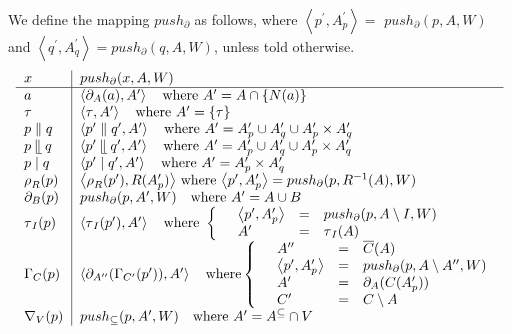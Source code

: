 \documentclass{article}
\begin{document}
We define the mapping $push_{\partial }$ as follows, where $\left\langle
p^{\prime },A_{p}^{\prime }\right\rangle =$ $push_{\partial }(p,A,W)$ and $%
\left\langle q^{\prime },A_{q}^{\prime }\right\rangle =push_{\partial
}(q,A,W)$, unless told otherwise.%
\[
\begin{tabular}{l|l}
$x$ & $push_{\partial }(x,A,W)$ \\ \hline
$a$ & $\left\langle \partial _{A}(a),A^{\prime }\right\rangle \text{ where }%
A^{\prime }=A\cap \{N(a)\}$ \\ 
$\tau $ & $\left\langle \tau ,A^{\prime }\right\rangle \text{ where }%
A^{\prime }=\{\tau \}$ \\ 
$p\parallel q$ & $\left\langle p^{\prime }\parallel q^{\prime },A^{\prime
}\right\rangle \text{ where }A^{\prime }=A_{p}^{\prime }\cup A_{q}^{\prime
}\cup A_{p}^{\prime }\times A_{q}^{\prime }$ \\ 
$p\mathbin{\mathrel{\llfloor}}q$ & $\left\langle p^{\prime }%
\mathbin{\mathrel{\llfloor}}q^{\prime },A^{\prime }\right\rangle \text{
where }A^{\prime }=A_{p}^{\prime }\cup A_{q}^{\prime }\cup A_{p}^{\prime
}\times A_{q}^{\prime }$ \\ 
$p\mid q$ & $\left\langle p^{\prime }\mid q^{\prime },A^{\prime
}\right\rangle \text{ where }A^{\prime }=A_{p}^{\prime }\times A_{q}^{\prime
}$ \\ 
$\rho _{R}(p)$ & $\left\langle \rho _{R}(p^{\prime }),R(A_{p}^{\prime
})\right\rangle $ where $\left\langle p^{\prime },A_{p}^{\prime
}\right\rangle =push_{\partial }(p,R^{-1}(A),W)$ \\ 
$\partial _{B}(p)$ & $push_{\partial }(p,A^{\prime },W)\text{ where }%
A^{\prime }=A\cup B$ \\ 
$\tau _{I}(p)$ & $\left\langle \tau _{I}(p^{\prime }),A^{\prime
}\right\rangle \text{ where }\left\{ \text{ }%
\begin{array}{lll}
\left\langle p^{\prime },A_{p}^{\prime }\right\rangle & = & push_{\partial
}(p,A\setminus I,W) \\ 
A^{\prime } & = & \tau _{I}(A)%
\end{array}%
\right. $ \\ 
$\Gamma _{C}(p)$ & $\left\langle \partial _{A^{\prime \prime }}(\Gamma
_{C^{\prime }}(p^{\prime })),A^{\prime }\right\rangle \text{ where}\left\{ 
\text{ }%
\begin{array}{lll}
A^{\prime \prime } & = & \overline{C}(A) \\ 
\left\langle p^{\prime },A_{p}^{\prime }\right\rangle & = & push_{\partial
}(p,A\setminus A^{\prime \prime },W) \\ 
A^{\prime } & = & \partial _{A}(C(A_{p}^{\prime })) \\ 
C^{\prime } & = & C\setminus A%
\end{array}%
\right. $ \\ 
$\nabla _{V}(p)$ & $push_{\subseteq }(p,A^{\prime },W)\text{ where }%
A^{\prime }=A^{\subseteq }\cap V$%
\end{tabular}%
\]
\end{document}
